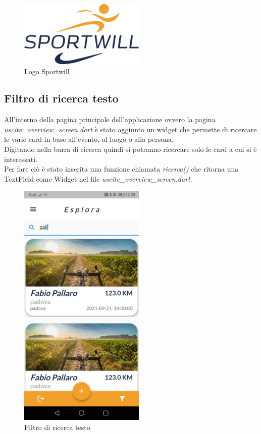 \begin{figure}[htbp]	
	\centering
	\includegraphics[width=6cm]{immagini/logosportwill.png}
	\caption{Logo Sportwill}
	\label{fig:Logo Sportwill}
\end{figure}

\newpage

\subsection{Filtro di ricerca testo}
All'interno della pagina principale dell'applicazione ovvero la pagina \textit{uscite\_overview\_screen.dart} è stato aggiunto un widget che permette di ricercare le varie card in base all'evento, al luogo o alla persona.\\
Digitando nella barra di ricerca quindi si potranno ricercare solo le card a cui si è interessati.\\
Per fare ciò è stato inserita una funzione chiamata \textit{ricerca()} che ritorna una TextField come Widget nel file \textit{uscite\_overview\_screen.dart}.\\

\begin{figure}[htbp]	
	\centering
	\includegraphics[width=6cm]{immagini/filtrotesto.jpeg}
	\caption{Filtro di ricerca testo}
	\label{fig:Filtro di ricerca testo}
\end{figure}

